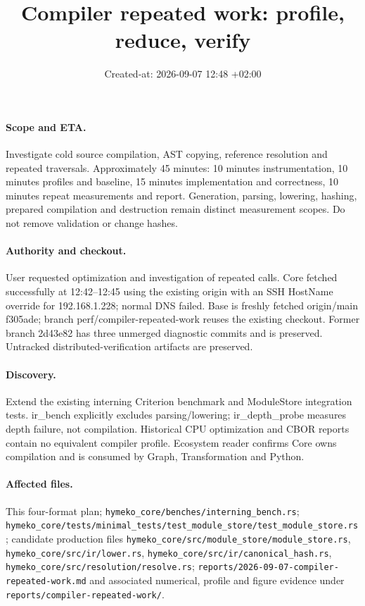 \documentclass[11pt,a4paper]{article}
\title{Compiler repeated work: profile, reduce, verify}
\date{Created-at: 2026-09-07 12:48 +02:00}
\begin{document}
\maketitle
\paragraph{Scope and ETA.} Investigate cold source compilation, AST copying,
reference resolution and repeated traversals. Approximately 45 minutes:
10 minutes instrumentation, 10 minutes profiles and baseline, 15 minutes
implementation and correctness, 10 minutes repeat measurements and report.
Generation, parsing, lowering, hashing, prepared compilation and destruction
remain distinct measurement scopes. Do not remove validation or change hashes.
\paragraph{Authority and checkout.} User requested optimization and investigation
of repeated calls. Core fetched successfully at 12:42--12:45 using the existing
origin with an SSH HostName override for 192.168.1.228; normal DNS failed.
Base is freshly fetched origin/main f305ade; branch perf/compiler-repeated-work
reuses the existing checkout. Former branch 2d43e82 has three unmerged diagnostic
commits and is preserved. Untracked distributed-verification artifacts are preserved.
\paragraph{Discovery.} Extend the existing interning Criterion benchmark and
ModuleStore integration tests. ir\_bench explicitly excludes parsing/lowering;
ir\_depth\_probe measures depth failure, not compilation. Historical CPU optimization
and CBOR reports contain no equivalent compiler profile. Ecosystem reader confirms
Core owns compilation and is consumed by Graph, Transformation and Python.
\paragraph{Affected files.} This four-format plan;
\texttt{hymeko\_core/benches/interning\_bench.rs};
\texttt{hymeko\_core/tests/minimal\_tests/test\_module\_store/test\_module\_store.rs};
candidate production files
\texttt{hymeko\_core/src/module\_store/module\_store.rs},
\texttt{hymeko\_core/src/ir/lower.rs},
\texttt{hymeko\_core/src/ir/canonical\_hash.rs},
\texttt{hymeko\_core/src/resolution/resolve.rs};
\texttt{reports/2026-09-07-compiler-repeated-work.md} and associated numerical,
profile and figure evidence under \texttt{reports/compiler-repeated-work/}.
\end{document}
